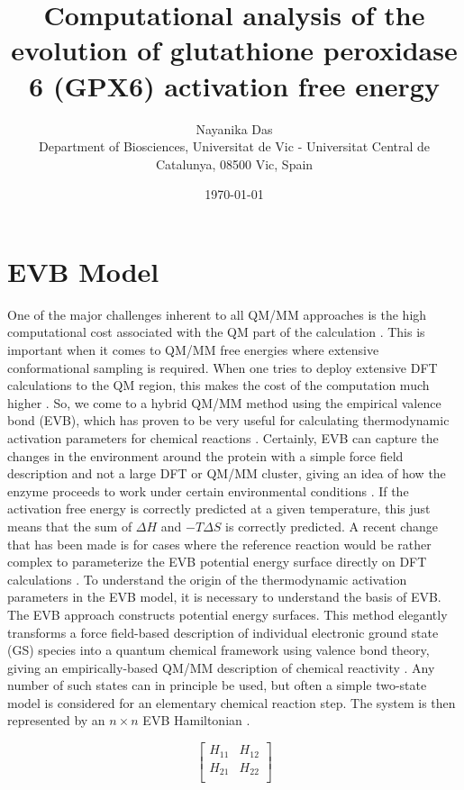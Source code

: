 \documentclass{article}
\title{Computational analysis of the evolution of glutathione peroxidase 6 (GPX6) activation free energy}
\author{Nayanika Das \\ Department of Biosciences, Universitat de Vic - Universitat Central de Catalunya, 08500 Vic, Spain}
\date{\today}
\begin{document}
\maketitle

\section{EVB Model}

One of the major challenges inherent to all QM/MM approaches is the high computational cost associated with the QM part of the calculation \cite{Carvalho2014}. This is important when it comes to QM/MM free energies where extensive conformational sampling is required. When one tries to deploy extensive DFT calculations to the QM region, this makes the cost of the computation much higher \cite{Carvalho2014}. So, we come to a hybrid QM/MM method using the empirical valence bond (EVB), which has proven to be very useful for calculating thermodynamic activation parameters for chemical reactions \cite{Oanca2024}. Certainly, EVB can capture the changes in the environment around the protein with a simple force field description and not a large DFT or QM/MM cluster, giving an idea of how the enzyme proceeds to work under certain environmental conditions \cite{Oanca2024}. If the activation free energy is correctly predicted at a given temperature, this just means that the sum of \(\Delta H\) and \(-T\Delta S\) is correctly predicted. A recent change that has been made is for cases where the reference reaction would be rather complex to parameterize the EVB potential energy surface directly on DFT calculations \cite{Oanca2024}. To understand the origin of the thermodynamic activation parameters in the EVB model, it is necessary to understand the basis of EVB. The EVB approach constructs potential energy surfaces. This method elegantly transforms a force field-based description of individual electronic ground state (GS) species into a quantum chemical framework using valence bond theory, giving an empirically-based QM/MM description of chemical reactivity \cite{Carvalho2014}. Any number of such states can in principle be used, but often a simple two-state model is considered for an elementary chemical reaction step. The system is then represented by an \(n \times n\) EVB Hamiltonian \cite{Carvalho2014}.

\[
  \left[ {\begin{array}{cc}
    H_{11} & H_{12} \\
    H_{21} & H_{22} \\
  \end{array} } \right]
\]
\end{document}
